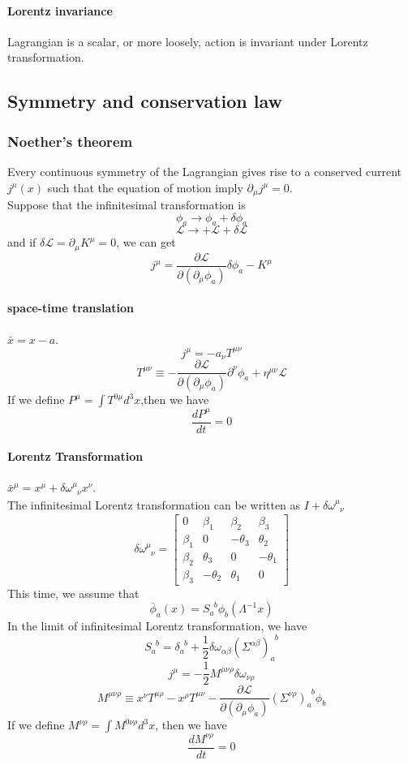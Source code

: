 \documentclass{article}
\begin{document}
\paragraph{Lorentz invariance} Lagrangian is a scalar, or more loosely, action is invariant under Lorentz transformation.

\subsection{Symmetry and conservation law}
\subsubsection{Noether's theorem}
Every continuous symmetry of the Lagrangian gives rise to a conserved current $j^{\mu}(x)$ such that the equation of motion imply $\partial_{\mu} j^{\mu} = 0$.\\
Suppose that the infinitesimal transformation is
\[\phi_a \rightarrow \phi_a + \delta \phi_a\]
\[\mathcal{L} \rightarrow + \mathcal{L} + \delta \mathcal{L} \]
and if $\delta \mathcal{L} = \partial_{\mu} K^{\mu} = 0$, we can get
\[j^{\mu} = \frac{\partial \mathcal{L}}{\partial (\partial_{\mu} \phi_a)} \delta \phi_a - K^{\mu}\]

\paragraph{space-time translation} $\bar{x} = x - a$.
\[j^{\mu} = -a_{\nu} T^{\mu \nu}\]
\[T^{\mu \nu} \equiv -\frac{\partial \mathcal{L}}{\partial(\partial_{\mu}\phi_a)} \partial^{\nu} \phi_a + \eta^{\mu \nu} \mathcal{L}\]
If we define $P^{\mu} = \int T^{0 \mu} d^3 x$,then we have
\[\frac{d P^{\mu}}{dt} = 0\]

\paragraph{Lorentz Transformation} $\bar{x}^{\mu} = x^{\mu} + \delta \omega^{\mu}_{\phantom{\mu}\nu} x^{\nu}$.\\
The infinitesimal Lorentz transformation can be written as $I+\delta \omega^{\mu}_{\phantom{\mu}\nu}$
\[\delta \omega^{\mu}_{\phantom{\mu}\nu} = \left[ 
\begin{matrix} 
0       & \beta_1   & \beta_2   & \beta_3   \\ 
\beta_1 & 0         & -\theta_3 & \theta_2  \\
\beta_2 & \theta_3  & 0         & -\theta_1 \\
\beta_3 & -\theta_2 & \theta_1  & 0
\end{matrix} 
\right]\]
This time, we assume that
\[\bar{\phi}_a(x) = S_{a}^{\phantom{a}b}\phi_b(\Lambda^{-1}x)\]
In the limit of infinitesimal Lorentz transformation, we have
\[S_{a}^{\phantom{a}b} = \delta_{a}^{\phantom{a}b}+\frac{1}{2} \delta \omega_{\alpha \beta} (\Sigma^{\alpha \beta})_{a}^{\phantom{a}b} \]
\[j^{\mu} = -\frac{1}{2} M^{\mu \nu \rho}  \delta \omega_{\nu \rho}\]
\[M^{\mu \nu \rho} \equiv x^{\nu}T^{\mu \rho} - x^{\rho} T^{\mu \nu} - \frac{\partial \mathcal{L}}{\partial (\partial_{\mu}\phi_a)}(\Sigma^{\nu \rho})_{a}^{\phantom{a}b}\phi_b\]
If we define $M^{\nu \rho} = \int M^{0 \nu \rho} d^3 x$, then we have
\[\frac{dM^{\nu \rho}}{dt} = 0\]
\end{document}
